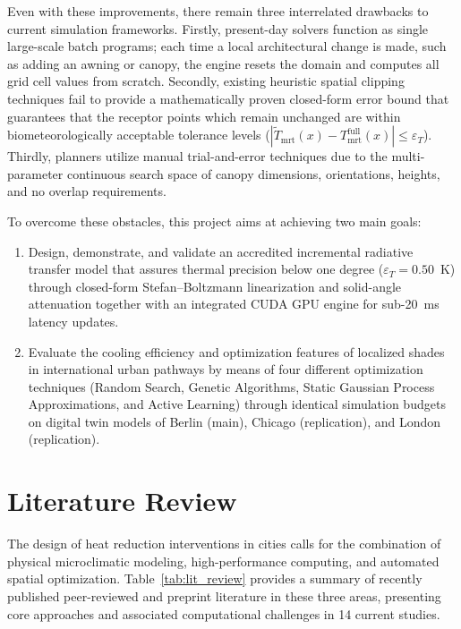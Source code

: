 \documentclass[conference]{IEEEtran}
\begin{document}
Even with these improvements, there remain three interrelated drawbacks to current simulation frameworks. Firstly, present-day solvers function as single large-scale batch programs; each time a local architectural change is made, such as adding an awning or canopy, the engine resets the domain and computes all grid cell values from scratch. Secondly, existing heuristic spatial clipping techniques fail to provide a mathematically proven closed-form error bound that guarantees that the receptor points which remain unchanged are within biometeorologically acceptable tolerance levels ($|\widetilde{T}_{\mathrm{mrt}}(x) - T_{\mathrm{mrt}}^{\mathrm{full}}(x)| \le \varepsilon_T$). Thirdly, planners utilize manual trial-and-error techniques due to the multi-parameter continuous search space of canopy dimensions, orientations, heights, and no overlap requirements.

To overcome these obstacles, this project aims at achieving two main goals:
\begin{enumerate}
    \item Design, demonstrate, and validate an accredited incremental radiative transfer model that assures thermal precision below one degree ($\varepsilon_T = 0.50$~K) through closed-form Stefan--Boltzmann linearization and solid-angle attenuation together with an integrated CUDA GPU engine for sub-20~ms latency updates.
    \item Evaluate the cooling efficiency and optimization features of localized shades in international urban pathways by means of four different optimization techniques (Random Search, Genetic Algorithms, Static Gaussian Process Approximations, and Active Learning) through identical simulation budgets on digital twin models of Berlin (main), Chicago (replication), and London (replication).
\end{enumerate}

\section{Literature Review}

The design of heat reduction interventions in cities calls for the combination of physical microclimatic modeling, high-performance computing, and automated spatial optimization. Table~\ref{tab:lit_review} provides a summary of recently published peer-reviewed and preprint literature in these three areas, presenting core approaches and associated computational challenges in 14 current studies.
\end{document}
